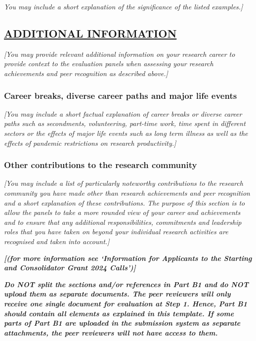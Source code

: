 \documentclass[b1]{erc} %
\begin{document}
\textit{You may include a short explanation of the significance of the listed examples.]}

\subsection*{\underline{ADDITIONAL INFORMATION}}

\textit{[You may provide relevant additional information on your research career to provide context to the evaluation panels when assessing your research achievements and peer recognition as described above.]}

\subsubsection*{Career breaks, diverse career paths and major life events}

\textit{[You may include a short factual explanation of career breaks or diverse career paths such as secondments, volunteering, part-time work, time spent in different sectors or the effects of major life events such as long term illness as well as the effects of pandemic restrictions on research productivity.]}

\subsubsection*{Other contributions to the research community}

\textit{[You may include a list of particularly noteworthy contributions to the research community you have made other than research achievements and peer recognition and a short explanation of these contributions. The purpose of this section is to allow the panels to take a more rounded view of your career and achievements and to ensure that any additional responsibilities, commitments and leadership roles that you have taken on beyond your individual research activities are recognised and taken into account.]}

\textit{\textbf{[(for more information see ‘Information for Applicants to the Starting and Consolidator Grant 2024 Calls’)]}}

\textbf{\textit{\color{red} Do NOT split the sections and/or references in Part B1 and do NOT upload them as separate documents. The peer reviewers will only receive one single document for evaluation at Step 1. Hence, Part B1 should contain all elements as explained in this template. If some parts of Part B1 are uploaded in the submission system as separate attachments, the peer reviewers will not have access to them.}}
\end{document}

